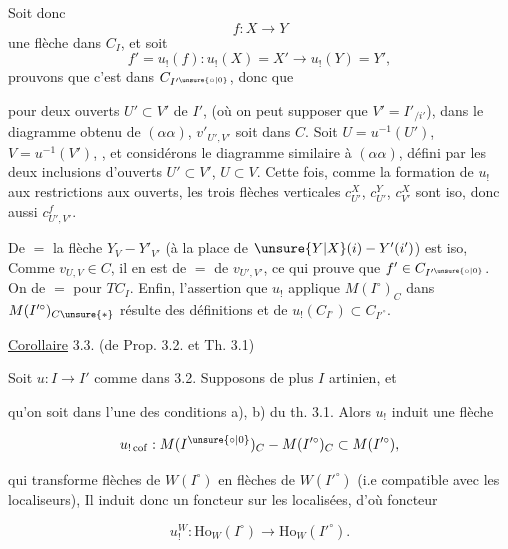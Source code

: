 
 Soit donc 
\[
 f:X\longrightarrow Y
\]
une flèche dans $C_I$, et soit
\[
 f'=u_!(f):u_!(X)=X'\longrightarrow u_!(Y)=Y',
\]
prouvons que c'est dans $C_{I'^{\unsure{\circ|0}}}$, donc que

pour deux ouverts $U'\subset V'$ de $I'$,  (où on peut supposer que $V'=I'_{/i'}$), dans le diagramme obtenu de $(\alpha\alpha)$, $v'_{U',V'}$ soit dans $C$. Soit $U=u^{-1}(U')$, $V=u^{-1}(V')$, , et considérons le diagramme similaire à $(\alpha\alpha)$, défini par les deux inclusions d'ouverts $U'\subset V'$, $U\subset V$. Cette fois, comme la formation de $u_!$  aux restrictions aux ouverts,  les trois flèches verticales $c^X_{U'}$, $c^Y_{U'}$, $c^X_{V'}$ sont iso, donc aussi $c^f_{U',V'}$.

De $=$ la flèche $Y_V\mathbin{-}Y'_{V'}$ (à la place de $\unsure{Y|X}(i)\mathbin{-}Y'(i')$) est iso, Comme $v_{U,V}\in C$, il en est de $=$ de $v_{U',V'}$, ce qui prouve que $f'\in C_{I'^{\unsure{\circ|0}}}$.  On  de $=$ pour $TC_I$. Enfin, l'assertion que $u_!$ applique $M(I^\circ)_C$ dans $M(I'^\circ)_{C\unsure{*}}$ résulte des  définitions et de $u_!(C_{I^\circ})\subset C_{I'^\circ}$.

\uline{Corollaire} 3.3. (de Prop. 3.2. et Th. 3.1)

Soit $u:I\longrightarrow I'$ comme dans 3.2. Supposons de plus $I$  artinien, et

qu'on soit  dans l'une des conditions a), b) du th. 3.1. Alors $u_!$ induit une flèche

\[
 u_{!\,\mathrm{cof}}:M(I^{\unsure{\circ|0}})_C\mathbin{-} M(I'^\circ)_C\subset M(I'^\circ),
\]

qui transforme flèches de $W(I^\circ)$ en flèches de $W(I'^\circ)$ (i.e compatible avec les localiseurs), Il induit donc un foncteur sur les localisées, d'où    foncteur 

\[
 u_!^W:\mathrm{Ho}_W(I^\circ)\longrightarrow\mathrm{Ho}_W(I'^\circ).\tag*{(3.3.1)}
\]

